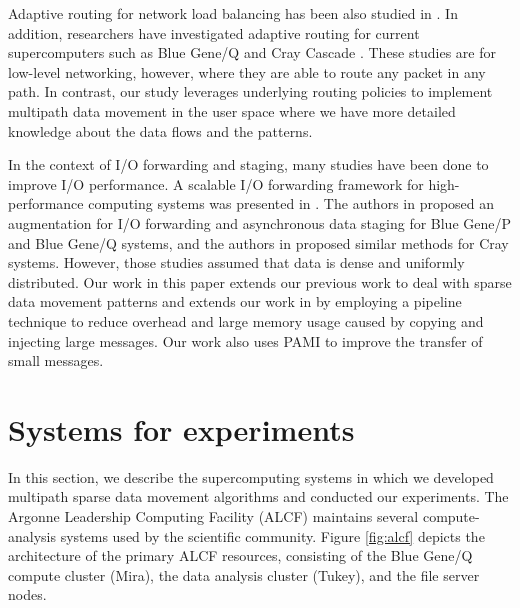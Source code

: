 \documentclass[final,5p,times]{elsarticle}
\begin{document}
Adaptive routing for network load balancing has been also studied in \cite{Valiant:Routing,singh2003:goal}. 
In addition, researchers have investigated adaptive routing for current supercomputers such as  Blue Gene/Q \cite{Chen:BGQ} and Cray Cascade \cite{garcia2013:CrayDragonfly}. These studies are for low-level networking, however, where they are able to route any packet in any path. In contrast, our study leverages underlying routing policies to implement multipath data movement in the user space where we have more detailed knowledge about the data flows and the patterns. 

In the context of I/O forwarding and staging, many studies have been done to improve I/O performance.   
A scalable I/O forwarding framework for high-performance computing systems was presented in \cite{Ali:IOForwarding,Iskra:IOForwarding}.
The authors in \cite{Vishwanath:IOForwarding,Vishwanath:GLEAN} proposed an augmentation for I/O forwarding and asynchronous data staging for Blue Gene/P and Blue Gene/Q systems, and the authors in \cite{ADIOS} proposed similar methods for Cray systems. However, those studies assumed that data is dense and uniformly distributed.
Our work in this paper extends our previous work \cite{Vishwanath:GLEAN} to deal with sparse data movement patterns and extends our work in \cite{Multipath:BGQ} by employing a pipeline technique to reduce overhead and large memory usage caused by copying and injecting large messages. Our work also uses PAMI to improve the transfer of small messages.

\section{Systems for experiments}
\label{sec:system}

In this section, we describe the supercomputing systems in which we developed multipath sparse data movement algorithms and conducted our experiments. The Argonne Leadership Computing Facility (ALCF) maintains several compute-analysis systems used by the scientific community. Figure \ref{fig:alcf} depicts the architecture of the primary ALCF resources, consisting of the Blue Gene/Q compute cluster (Mira), the data analysis cluster (Tukey), and the file server nodes.
\end{document}
